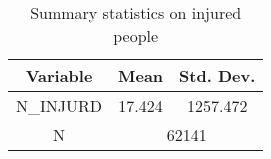
\begin{table}[htbp]\centering \caption{Summary statistics on injured people \label{sumstat}}
\begin{tabular}{l c c  }\hline\hline
\multicolumn{1}{c}{\textbf{Variable}} & \textbf{Mean}
 & \textbf{Std. Dev.} \\ \hline
N\_INJURD & 17.424 & 1257.472  \\
\multicolumn{1}{c}{N} & \multicolumn{2}{c}{62141}\\ \hline\end{tabular}
\end{table}
